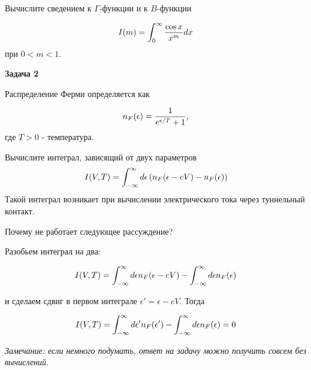 \documentclass[a4paper,12pt]{article}
\begin{document}
\noindent Вычислите сведением к $\Gamma$-функции и к $B$-функции

\begin{equation}
I(m)	=\int_{0}^{\infty}\frac{\cos x}{x^{m}}dx \notag
\end{equation}
при $0<m<1$.

\vspace{15pt}
\noindent \textbf{Задача 2}

\noindent Распределение Ферми определяется как

\begin{equation}
n_{F}(\epsilon)	=\frac{1}{e^{\epsilon/T}+1},\notag
\end{equation}
где $T>0$ - температура.

\noindent Вычислите интеграл, зависящий от двух параметров
\begin{equation}
I(V,T)	=\int_{-\infty}^{\infty}d\epsilon\left(n_{F}(\epsilon-eV)-n_{F}(\epsilon)\right)\notag
\end{equation}
\noindent Такой интеграл возникает при вычислении электрического тока через туннельный контакт.

\noindent Почему не работает следующее рассуждение?

\noindent Разобьем интеграл на два:

\begin{equation}
I(V,T)	=\int_{-\infty}^{\infty}d\epsilon n_{F}(\epsilon-eV)-\int_{-\infty}^{\infty}d\epsilon n_{F}(\epsilon)\notag
\end{equation}

\noindent и сделаем сдвиг в первом интеграле $\epsilon'=\epsilon-eV$. Тогда

\begin{equation} 
I(V,T)	=\int_{-\infty}^{\infty}d\epsilon'n_{F}(\epsilon')-\int_{-\infty}^{\infty}d\epsilon n_{F}(\epsilon)=0 \notag
\end{equation}

\noindent \textit{Замечание: если немного подумать, ответ на задачу можно получить совсем без вычислений.}
\end{document}

